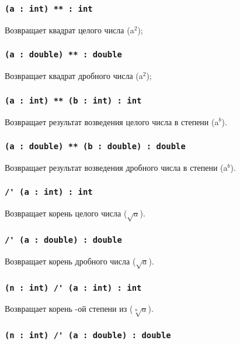 \subsubsection{\lstinline`(a : int) ** : int`}

Возвращает квадрат целого числа  (a$^2$);

\subsubsection{\lstinline`(a : double) ** : double`}

Возвращает квадрат дробного числа  (a$^2$);

\subsubsection{\lstinline`(a : int) ** (b : int) : int`}

Возвращает результат возведения целого числа  в степени  (a$^b$).

\subsubsection{\lstinline`(a : double) ** (b : double) : double`}

Возвращает результат возведения дробного числа  в степени  (a$^b$).

\subsubsection{\lstinline`/' (a : int) : int`}

Возвращает корень целого числа  ($\sqrt{a}$).

\subsubsection{\lstinline`/' (a : double) : double`}

Возвращает корень дробного числа  ($\sqrt{a}$).

\subsubsection{\lstinline`(n : int) /' (a : int) : int`}

Возвращает корень -ой степени из  ($\sqrt[n]{a}$).

\subsubsection{\lstinline`(n : int) /' (a : double) : double`}

